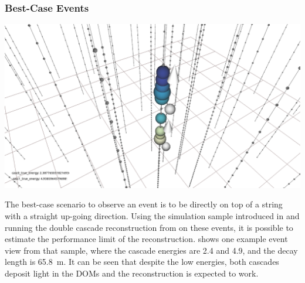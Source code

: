 \subsubsection{Best-Case Events}

\begin{marginfigure}
    \centering
    \includegraphics[trim=270 40 225 35, clip]{figures/model_independent_simulation/upgoing_e0_2.4_e1_4.9_v2.png}
    \caption[Event view of an up-going double cascade event]{Event view of an up-going double cascade event, with cascade energies of \SI{2.4}{\gev} and \SI{4.9}{\gev}, and a decay length of \SI{65.8}{\meter}. The colored spheres show the DOMs that have observed light, where the size is proportional to the number of observed photons and the color indicates the time (yellow is early, blue is late). The strings are shown as black lines, with small spheres indicating the DOM positions, and the true cascade vertices and directions are shown as white spheres with white arrows.}
\end{marginfigure}

The best-case scenario to observe an event is to be directly on top of a string with a straight up-going direction. Using the simulation sample introduced in  and running the double cascade reconstruction from  on these events, it is possible to estimate the performance limit of the reconstruction.  shows one example event view from that sample, where the cascade energies are \SI{2.4}{\gev} and \SI{4.9}{\gev}, and the decay length is \SI{65.8}{\meter}. It can be seen that despite the low energies, both cascades deposit light in the DOMs and the reconstruction is expected to work.

